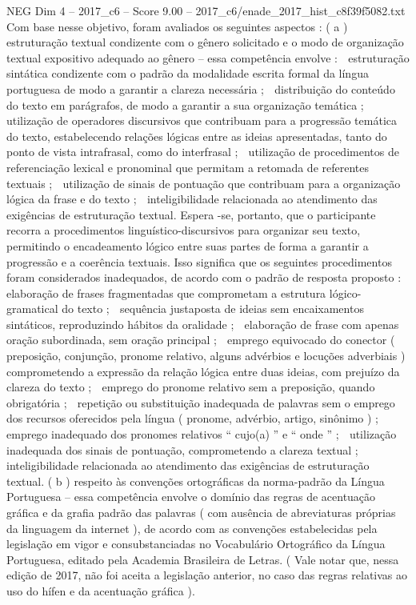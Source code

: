 \begin{textsample}{NEG Dim 4 – 2017\_c6 – Score 9.00 – 2017\_c6/enade\_2017\_hist\_c8f39f5082.txt}
Com base nesse objetivo, foram avaliados os seguintes aspectos : ( a ) estruturação textual condizente com o gênero solicitado e o modo de organização textual expositivo adequado ao gênero – essa competência envolve :  estruturação sintática condizente com o padrão da modalidade escrita formal da língua portuguesa de modo a garantir a clareza necessária ;  distribuição do conteúdo do texto em parágrafos, de modo a garantir a sua organização temática ;  utilização de operadores discursivos que contribuam para a progressão temática do texto, estabelecendo relações lógicas entre as ideias apresentadas, tanto do ponto de vista intrafrasal, como do interfrasal ;  utilização de procedimentos de referenciação lexical e pronominal que permitam a retomada de referentes textuais ;  utilização de sinais de pontuação que contribuam para a organização lógica da frase e do texto ;  inteligibilidade relacionada ao atendimento das exigências de estruturação textual.
Espera -se, portanto, que o participante recorra a procedimentos linguístico-discursivos para organizar seu texto, permitindo o encadeamento lógico entre suas partes de forma a garantir a progressão e a coerência textuais.
Isso significa que os seguintes procedimentos foram considerados inadequados, de acordo com o padrão de resposta proposto :  elaboração de frases fragmentadas que comprometam a estrutura lógico-gramatical do texto ;  sequência justaposta de ideias sem encaixamentos sintáticos, reproduzindo hábitos da oralidade ;  elaboração de frase com apenas oração subordinada, sem oração principal ;  emprego equivocado do conector ( preposição, conjunção, pronome relativo, alguns advérbios e locuções adverbiais ) comprometendo a expressão da relação lógica entre duas ideias, com prejuízo da clareza do texto ;  emprego do pronome relativo sem a preposição, quando obrigatória ;  repetição ou substituição inadequada de palavras sem o emprego dos recursos oferecidos pela língua ( pronome, advérbio, artigo, sinônimo ) ;  emprego inadequado dos pronomes relativos “ cujo(a) ” e “ onde ” ;  utilização inadequada dos sinais de pontuação, comprometendo a clareza textual ;  inteligibilidade relacionada ao atendimento das exigências de estruturação textual. ( b ) respeito às convenções ortográficas da norma-padrão da Língua Portuguesa – essa competência envolve o domínio das regras de acentuação gráfica e da grafia padrão das palavras ( com ausência de abreviaturas próprias da linguagem da internet ), de acordo com as convenções estabelecidas pela legislação em vigor e consubstanciadas no Vocabulário Ortográfico da Língua Portuguesa, editado pela Academia Brasileira de Letras. ( Vale notar que, nessa edição de 2017, não foi aceita a legislação anterior, no caso das regras relativas ao uso do hífen e da acentuação gráfica ).

\end{textsample}
